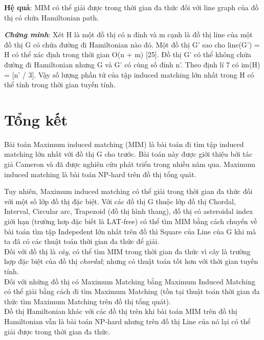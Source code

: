 \documentclass[14pt,a4paper]{extreport}
\begin{document}
\textbf{Hệ quả}: MIM có thể giải được trong thời gian đa thức đối với line graph của đồ thị có chứa Hamiltonian path.

\textit{\textbf{Chứng minh}}: Xét H là một đồ thị có n đỉnh và m cạnh là đồ thị line của một đồ thị G có chứa đường đi Hamiltonian nào đó. Một đồ thị G’ sao cho      line(G’) = H có thể xác định trong thời gian O(n + m) [25]. Đồ thị G’ có thể không chứa đường đi Hamiltonian nhưng G và G’ có cùng số đỉnh n’. Theo định lí 7 có im(H) = [n’ / 3]. Vậy số lượng phần tử của tập induced matching lớn nhất trong H có thể tính trong thời gian tuyến tính.

\chapter{Tổng kết}
Bài toán Maximum induced matching (MIM) là bài toán đi tìm tập induced matching lớn nhất với đồ thị G cho trước.  Bài toán này được giới thiệu bởi tác giả Cameron và đã được nghiên cứu phát triển trong nhiều năm qua. Maximum induced matching là bài toán NP-hard trên đồ thị tổng quát.

Tuy nhiên, Maximum induced matching có thể giải trong thời gian đa thức đối với một số lớp đồ thị đặc biệt. Với các đồ thị G thuộc lớp đồ thị Chordal, Interval, Circular arc, Trapezoid (đồ thị hình thang), đồ thị có asteroidal index giới hạn (trường hơp đặc biết là LAT-free) có thể tìm MIM bằng cách chuyển về bài toán tìm tập Indepedent lớn nhất trên đồ thì Square của Line của G khi mà ta đã có các thuật toán thời gian đa thức để giải.\\
Đối với đồ thị là \textit{cây}, có thể tìm MIM trong thời gian đa thức vì cây là trường hợp đặc biệt của đồ thị \textit{chordal}; nhưng có thuật toán tốt hơn với thời gian tuyến tính.\\
Đối với những đồ thị có Maximum Matching bằng Maximum Induced Matching có thể giải bằng cách đi tìm Maximum Matching (tồn tại thuật toán thời gian đa thức tìm Maximum Matching trên đồ thị tổng quát).\\
Đồ thị Hamiltonian khác với các đồ thị trên khi bài toán MIM trên đồ thị Hamiltonian vẫn là bài toán NP-hard nhưng trên đồ thị Line của nó lại có thể giải được trong thời gian đa thức.
 
\end{document}
